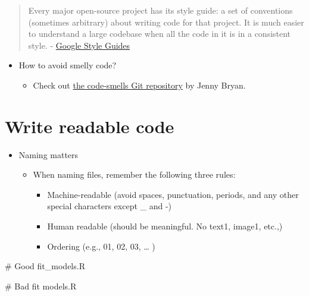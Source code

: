 \documentclass[
  letterpaper,
  DIV=11,
  numbers=noendperiod]{scrreprt}
\newenvironment{Shaded}{\begin{snugshade}}{\end{snugshade}}
\newcommand{\CommentTok}[1]{\textcolor[rgb]{0.37,0.37,0.37}{#1}}
\newcommand{\NormalTok}[1]{\textcolor[rgb]{0.00,0.23,0.31}{#1}}
\providecommand{\tightlist}{%
  \setlength{\itemsep}{0pt}\setlength{\parskip}{0pt}}\usepackage{longtable,booktabs,array}
\begin{document}
\begin{quote}
Every major open-source project has its style guide: a set of
conventions (sometimes arbitrary) about writing code for that project.
It is much easier to understand a large codebase when all the code in it
is in a consistent style. -
\href{https://google.GitHub.io/styleguide/}{Google Style Guides}
\end{quote}

\begin{itemize}
\item
  How to avoid smelly code?

  \begin{itemize}
  \tightlist
  \item
    Check out
    \href{https://GitHub.com/jennybc/code-smells-and-feels\#readme}{the
    code-smells Git repository} by Jenny Bryan.
  \end{itemize}
\end{itemize}

\hypertarget{write-readable-code}{%
\section*{Write readable code}\label{write-readable-code}}

\begin{itemize}
\item
  Naming matters

  \begin{itemize}
  \tightlist
  \item
    When naming files, remember the following three rules:

    \begin{itemize}
    \tightlist
    \item
      Machine-readable (avoid spaces, punctuation, periods, and any
      other special characters except \_ and -)
    \item
      Human readable (should be meaningful. No text1, image1, etc.,)
    \item
      Ordering (e.g., 01, 02, 03, \ldots{} )
    \end{itemize}
  \end{itemize}
\end{itemize}

\begin{Shaded}
\begin{Highlighting}[]
\CommentTok{\# Good}
\NormalTok{fit\_models.R}

\CommentTok{\# Bad}
\NormalTok{fit models.R}
\end{Highlighting}
\end{Shaded}
\end{document}
